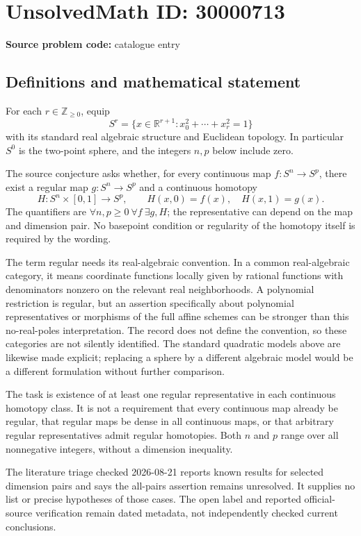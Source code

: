 \documentclass[11pt]{article}
\newcommand{\Z}{\mathbb{Z}}
\newcommand{\R}{\mathbb{R}}
\begin{document}
\section*{UnsolvedMath ID: 30000713}
\textbf{Source problem code:} catalogue entry
\subsection{Definitions and mathematical statement}
For each \(r\in\Z_{\geq0}\), equip
\[
 S^r=\{x\in\R^{r+1}:x_0^2+\cdots+x_r^2=1\}
\]
with its standard real algebraic structure and Euclidean topology. In particular \(S^0\) is the two-point sphere, and the integers \(n,p\) below include zero.

The source conjecture asks whether, for every continuous map \(f:S^n\to S^p\), there exist a regular map \(g:S^n\to S^p\) and a continuous homotopy
\[
 H:S^n\times[0,1]\longrightarrow S^p,
 \qquad H(x,0)=f(x),\quad H(x,1)=g(x).
\]
The quantifiers are \(\forall n,p\geq0\ \forall f\ \exists g,H\); the representative can depend on the map and dimension pair. No basepoint condition or regularity of the homotopy itself is required by the wording.

The term regular needs its real-algebraic convention. In a common real-algebraic category, it means coordinate functions locally given by rational functions with denominators nonzero on the relevant real neighborhoods. A polynomial restriction is regular, but an assertion specifically about polynomial representatives or morphisms of the full affine schemes can be stronger than this no-real-poles interpretation. The record does not define the convention, so these categories are not silently identified. The standard quadratic models above are likewise made explicit; replacing a sphere by a different algebraic model would be a different formulation without further comparison.

The task is existence of at least one regular representative in each continuous homotopy class. It is not a requirement that every continuous map already be regular, that regular maps be dense in all continuous maps, or that arbitrary regular representatives admit regular homotopies. Both \(n\) and \(p\) range over all nonnegative integers, without a dimension inequality.

The literature triage checked 2026-08-21 reports known results for selected dimension pairs and says the all-pairs assertion remains unresolved. It supplies no list or precise hypotheses of those cases. The open label and reported official-source verification remain dated metadata, not independently checked current conclusions.
\end{document}
